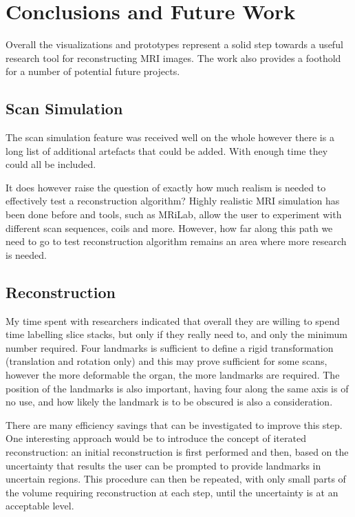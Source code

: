 \chapter{Conclusions and Future Work}
Overall the visualizations and prototypes represent a solid step towards a useful research tool for reconstructing MRI images. The work also provides a foothold for a number of potential future projects.

\section{Scan Simulation}
The scan simulation feature was received well on the whole however there is a long list of additional artefacts that could be added. With enough time they could all be included.

It does however raise the question of exactly how much realism is needed to effectively test a reconstruction algorithm? Highly realistic MRI simulation has been done before and tools, such as MRiLab\cite{mrilab}, allow the user to experiment with different scan sequences, coils and more. However, how far along this path we need to go to test reconstruction algorithm remains an area where more research is needed.

\section{Reconstruction}
My time spent with researchers indicated that overall they are willing to spend time labelling slice stacks, but only if they really need to, and only the minimum number required. Four landmarks is sufficient to define a rigid transformation (translation and rotation only) and this may prove sufficient for some scans, however the more deformable the organ, the more landmarks are required. The position of the landmarks is also important, having four  along the same axis is of no use, and how likely the landmark is to be obscured is also a consideration.

There are many efficiency savings that can be investigated to improve this step. One interesting approach would be to introduce the concept of iterated reconstruction: an initial reconstruction is first performed and then, based on the uncertainty that results the user can be prompted to provide landmarks in uncertain regions. This procedure can then be repeated, with only small parts of the volume requiring reconstruction at each step, until the uncertainty is at an acceptable level.

